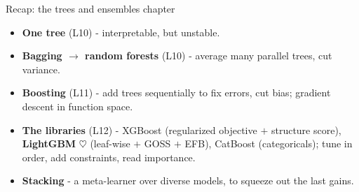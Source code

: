\documentclass[aspectratio=169]{beamer}
\begin{document}
\begin{frame}{Recap: the trees and ensembles chapter}
  \begin{itemize}\small
    \item \textbf{One tree} (L10) - interpretable, but unstable.
    \item \textbf{Bagging $\to$ random forests} (L10) - average many parallel trees, cut variance.
    \item \textbf{Boosting} (L11) - add trees sequentially to fix errors, cut bias; gradient
      descent in function space.
    \item \textbf{The libraries} (L12) - XGBoost (regularized objective $+$ structure score),
      \textbf{LightGBM} \textcolor{armred}{$\heartsuit$} (leaf-wise $+$ GOSS $+$ EFB), CatBoost
      (categoricals); tune in order, add constraints, read importance.
    \item \textbf{Stacking} - a meta-learner over diverse models, to squeeze out the last gains.
  \end{itemize}
  \vfill
\end{frame}
\end{document}
